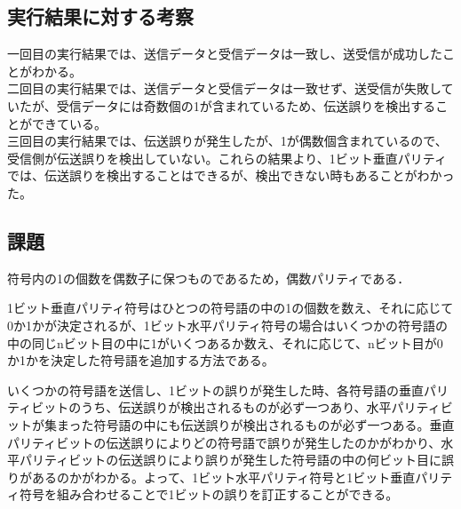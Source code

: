 \documentclass[a4j]{celb-report}
\begin{document}
\subsection{実行結果に対する考察}
一回目の実行結果では、送信データと受信データは一致し、送受信が成功したことがわかる。\\
二回目の実行結果では、送信データと受信データは一致せず、送受信が失敗していたが、受信データには奇数個の1が含まれているため、伝送誤りを検出することができている。\\
三回目の実行結果では、伝送誤りが発生したが、1が偶数個含まれているので、受信側が伝送誤りを検出していない。これらの結果より、1ビット垂直パリティでは、伝送誤りを検出することはできるが、検出できない時もあることがわかった。


\subsection{課題} 


符号内の1の個数を偶数子に保つものであるため，偶数パリティである．


1ビット垂直パリティ符号はひとつの符号語の中の1の個数を数え、それに応じて0か1かが決定されるが、1ビット水平パリティ符号の場合はいくつかの符号語の中の同じnビット目の中に1がいくつあるか数え、それに応じて、nビット目が0か1かを決定した符号語を追加する方法である。


いくつかの符号語を送信し、1ビットの誤りが発生した時、各符号語の垂直パリティビットのうち、伝送誤りが検出されるものが必ず一つあり、水平パリティビットが集まった符号語の中にも伝送誤りが検出されるものが必ず一つある。垂直パリティビットの伝送誤りによりどの符号語で誤りが発生したのかがわかり、水平パリティビットの伝送誤りにより誤りが発生した符号語の中の何ビット目に誤りがあるのかがわかる。よって、1ビット水平パリティ符号と1ビット垂直パリティ符号を組み合わせることで1ビットの誤りを訂正することができる。
%
\end{document}
